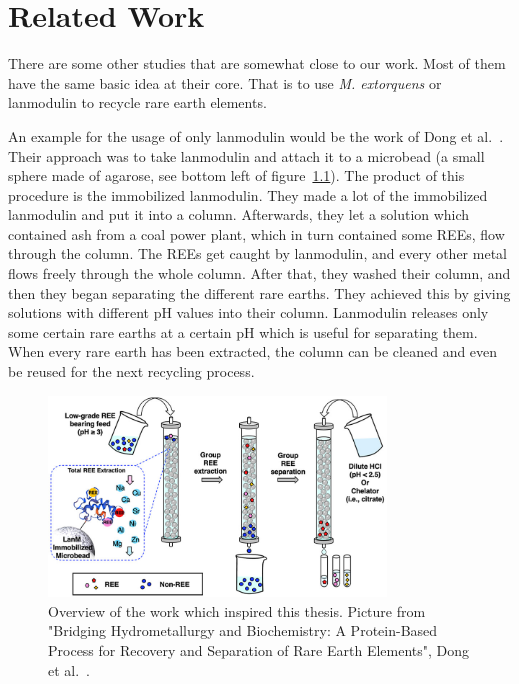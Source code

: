 \chapter{Related Work\authorA{}}

There are some other studies that are somewhat close to our work.
Most of them have the same basic idea at their core.
That is to use \emph{M. extorquens} or lanmodulin to recycle rare earth elements.

An example for the usage of only lanmodulin would be the work of Dong et al.~\cite{originalstudy}.
Their approach was to take lanmodulin and attach it to a microbead (a small sphere made of agarose, see bottom left of figure~\ref{fig:original_study_process}).
The product of this procedure is the immobilized lanmodulin.
They made a lot of the immobilized lanmodulin and put it into a column.
Afterwards, they let a solution which contained ash from a coal power plant, which in turn contained some REEs, flow through the column.
The REEs get caught by lanmodulin, and every other metal flows freely through the whole column.
After that, they washed their column, and then they began separating the different rare earths.
They achieved this by giving solutions with different pH values into their column.
Lanmodulin releases only some certain rare earths at a certain pH which is useful for separating them.
When every rare earth has been extracted, the column can be cleaned and even be reused for the next recycling process.

\begin{figure}[H]
    \centering
    \includegraphics[width=0.8\textwidth]{./media/images/original_study_process}
    \caption{Overview of the work which inspired this thesis.
    Picture from "Bridging Hydrometallurgy and Biochemistry:
    A Protein-Based Process for Recovery and Separation of Rare Earth Elements", Dong et al.~\cite{originalstudy}.}
    \label{fig:original_study_process}
\end{figure}


